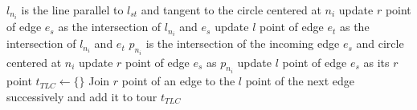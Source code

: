 \documentclass{llncs}
\begin{document}
\begin{algorithm}[h!]%
	\begin{spacing}{1}
	\begin{algorithmic}[1]
						\State $l_{n_i}$ is the line parallel to $l_{st}$ and tangent to the circle centered at $n_i$
						\State update $r$ point of edge $e_{s}$ as the intersection of $l_{n_i}$ and $e_{s}$
						\State update $l$ point of edge $e_{t}$ as the intersection of $l_{n_i}$ and $e_{t}$
					\EndIf
				\Else
					\State $p_{n_i}$ is the intersection of the incoming edge $e_s$ and circle centered at $n_i$
 						\State update $r$ point of edge $e_{s}$ as $p_{n_i}$
 							\State update $l$ point of edge $e_{s}$ as its $r$ point
 						\EndIf
					\EndIf
				\EndIf
			\EndFor
			\State $t_{TLC} \leftarrow \{ \}$
			\State Join $r$ point of an edge to the $l$ point of the next edge successively and add it to
			tour $t_{TLC}$
	\end{algorithmic}
	\end{spacing}
	\caption{Generating Tight Label Covering Tour in Iteration 1}
	\label{algo:tlc_generation_iteration_1}
\end{algorithm} 
\end{document}
